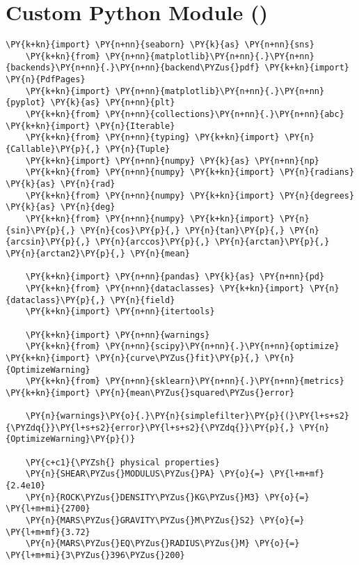 \chapter{Custom Python Module ()}\label{app:code}

\begin{tcolorbox}[breakable, size=fbox, boxrule=1pt, pad at break*=1mm,colback=cellbackground, colframe=cellborder]
    \begin{Verbatim}[commandchars=\\\{\}]
    \PY{k+kn}{import} \PY{n+nn}{seaborn} \PY{k}{as} \PY{n+nn}{sns}
    \PY{k+kn}{from} \PY{n+nn}{matplotlib}\PY{n+nn}{.}\PY{n+nn}{backends}\PY{n+nn}{.}\PY{n+nn}{backend\PYZus{}pdf} \PY{k+kn}{import} \PY{n}{PdfPages}
    \PY{k+kn}{import} \PY{n+nn}{matplotlib}\PY{n+nn}{.}\PY{n+nn}{pyplot} \PY{k}{as} \PY{n+nn}{plt}
    \PY{k+kn}{from} \PY{n+nn}{collections}\PY{n+nn}{.}\PY{n+nn}{abc} \PY{k+kn}{import} \PY{n}{Iterable}
    \PY{k+kn}{from} \PY{n+nn}{typing} \PY{k+kn}{import} \PY{n}{Callable}\PY{p}{,} \PY{n}{Tuple}
    \PY{k+kn}{import} \PY{n+nn}{numpy} \PY{k}{as} \PY{n+nn}{np}
    \PY{k+kn}{from} \PY{n+nn}{numpy} \PY{k+kn}{import} \PY{n}{radians} \PY{k}{as} \PY{n}{rad}
    \PY{k+kn}{from} \PY{n+nn}{numpy} \PY{k+kn}{import} \PY{n}{degrees} \PY{k}{as} \PY{n}{deg}
    \PY{k+kn}{from} \PY{n+nn}{numpy} \PY{k+kn}{import} \PY{n}{sin}\PY{p}{,} \PY{n}{cos}\PY{p}{,} \PY{n}{tan}\PY{p}{,} \PY{n}{arcsin}\PY{p}{,} \PY{n}{arccos}\PY{p}{,} \PY{n}{arctan}\PY{p}{,} \PY{n}{arctan2}\PY{p}{,} \PY{n}{mean}
    
    \PY{k+kn}{import} \PY{n+nn}{pandas} \PY{k}{as} \PY{n+nn}{pd}
    \PY{k+kn}{from} \PY{n+nn}{dataclasses} \PY{k+kn}{import} \PY{n}{dataclass}\PY{p}{,} \PY{n}{field}
    \PY{k+kn}{import} \PY{n+nn}{itertools}
    
    \PY{k+kn}{import} \PY{n+nn}{warnings}
    \PY{k+kn}{from} \PY{n+nn}{scipy}\PY{n+nn}{.}\PY{n+nn}{optimize} \PY{k+kn}{import} \PY{n}{curve\PYZus{}fit}\PY{p}{,} \PY{n}{OptimizeWarning}
    \PY{k+kn}{from} \PY{n+nn}{sklearn}\PY{n+nn}{.}\PY{n+nn}{metrics} \PY{k+kn}{import} \PY{n}{mean\PYZus{}squared\PYZus{}error}
    
    \PY{n}{warnings}\PY{o}{.}\PY{n}{simplefilter}\PY{p}{(}\PY{l+s+s2}{\PYZdq{}}\PY{l+s+s2}{error}\PY{l+s+s2}{\PYZdq{}}\PY{p}{,} \PY{n}{OptimizeWarning}\PY{p}{)}
    
    \PY{c+c1}{\PYZsh{} physical properties}
    \PY{n}{SHEAR\PYZus{}MODULUS\PYZus{}PA} \PY{o}{=} \PY{l+m+mf}{2.4e10}
    \PY{n}{ROCK\PYZus{}DENSITY\PYZus{}KG\PYZus{}M3} \PY{o}{=} \PY{l+m+mi}{2700}
    \PY{n}{MARS\PYZus{}GRAVITY\PYZus{}M\PYZus{}S2} \PY{o}{=} \PY{l+m+mf}{3.72}
    \PY{n}{MARS\PYZus{}EQ\PYZus{}RADIUS\PYZus{}M} \PY{o}{=} \PY{l+m+mi}{3\PYZus{}396\PYZus{}200}
    

\end{Verbatim}
\end{tcolorbox}
